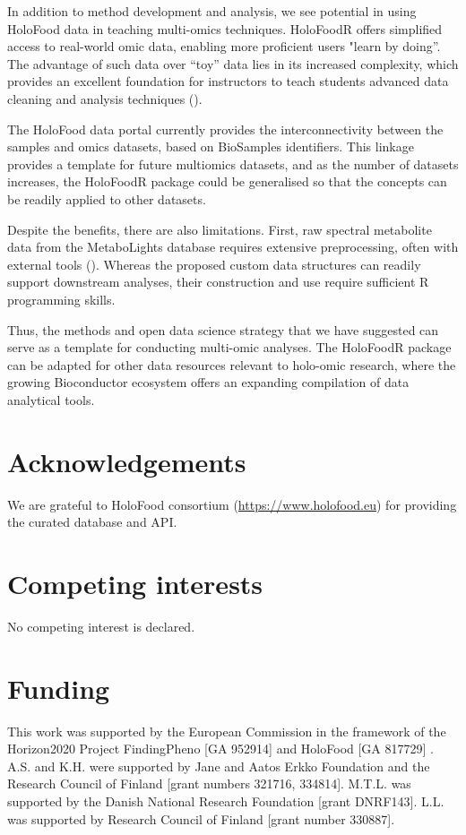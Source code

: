 \documentclass[unnumsec,webpdf,namedate,modern,large]{oup-authoring-template}%
\begin{document}
In addition to method development and analysis, we see potential in using HoloFood data in teaching multi-omics techniques. HoloFoodR offers simplified access to real-world omic data, enabling more proficient users "learn by doing”. The advantage of such data over “toy” data lies in its increased complexity, which provides an excellent foundation for instructors to teach students advanced data cleaning and analysis techniques (\cite{drnevich_2024}).

The HoloFood data portal currently provides the interconnectivity between the samples and omics datasets, based on BioSamples identifiers. This linkage provides a template for future multiomics datasets, and as the number of datasets increases, the HoloFoodR package could be generalised so that the concepts can be readily applied to other datasets.

Despite the benefits, there are also limitations. First, raw spectral metabolite data from the MetaboLights database requires extensive preprocessing, often with external tools (\cite{klavus_2020}). Whereas the proposed custom data structures can readily support downstream analyses, their construction and use require sufficient R programming skills.

Thus, the methods and open data science strategy that we have suggested can serve as a template for conducting multi-omic analyses. The HoloFoodR package can be adapted for other data resources relevant to holo-omic research, where the growing Bioconductor ecosystem offers an expanding compilation of data analytical tools. 

\section{Acknowledgements}

We are grateful to HoloFood consortium (\url{https://www.holofood.eu}) for providing the curated database and API.


\section{Competing interests}
No competing interest is declared.

\section{Funding}
This work was supported by the European Commission in the framework of the Horizon2020 Project FindingPheno [GA  952914] and HoloFood [GA 817729] . A.S. and K.H. were  supported by Jane and Aatos Erkko Foundation and the Research Council of Finland [grant numbers 321716, 334814]. M.T.L. was supported by the Danish National Research Foundation [grant DNRF143].  L.L. was supported by Research Council of Finland [grant number 330887].

\printbibliography
\end{document}
